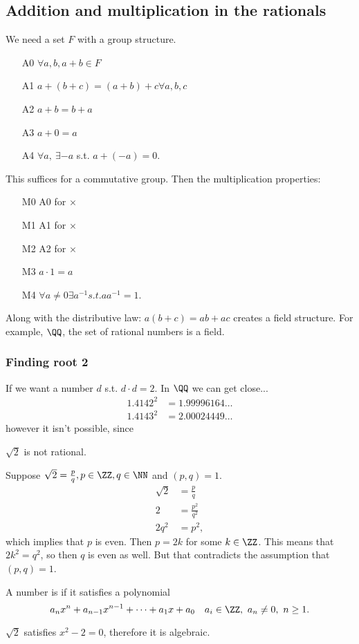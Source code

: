 \documentclass[11pt]{scrartcl}
\numberwithin{equation}{section}
\begin{document}
\subsection{Addition and multiplication in the rationals}
We need a set $F$ with a group structure.
\begin{enumerate}
    \item[A0] $\forall a,b, a+b\in F$
    \item[A1] $a+(b+c) = (a+b)+c\forall a,b,c$
    \item[A2] $a+b=b+a$
    \item[A3] $a+0=a$
    \item[A4] $\forall a, \ \exists-a$ s.t. $a + (-a) = 0$.
\end{enumerate}
This suffices for a commutative group. Then the multiplication properties:
\begin{enumerate}[1.]
    \item[M0] A0 for $\times$
    \item[M1] A1 for $\times$
    \item[M2] A2 for $\times$
    \item[M3] $a\cdot1 = a$
    \item[M4] $\forall a\neq0\exists a^{-1} s.t. aa^{-1}=1$.
\end{enumerate}
Along with the distributive law: $a(b+c) = ab +ac$ creates a field structure. 
For example, $\QQ$, the set of rational numbers is a field.
\subsubsection{Finding root 2}
If we want a number $d$ s.t. $d\cdot d = 2$. In $\QQ$ we can get close... 
\begin{align*}
    1.4142^2 &= 1.99996164\dots \\
    1.4143^2 &= 2.00024449\dots
\end{align*}
however it isn't possible, since
\begin{claim}
    $\sqrt2$ is not rational.
\end{claim}
\begin{subproof}
    Suppose $\sqrt2 = \frac{p}{q}, p \in \ZZ, q \in \NN$ and $(p,q) = 1$.
    \begin{align*}
        \sqrt{2} &= \frac{p}{q} \\
        2 &= \frac{p^2}{q^2} \\
        2q^2 &= p^2,
    \end{align*}
    which implies that $p$ is even. Then $p = 2k$ for some $k \in \ZZ$.
    This means that $2k^2 = q^2$, so then $q$ is even as well. But that contradicts the assumption that $(p,q)=1$.
\end{subproof}
\begin{definition}
    A number is  if it satisfies a polynomial
    \[ a_nx^n + a_{n-1}x^{n-1}+\cdots+a_1x+a_0 \quad a_i \in \ZZ, \ a_n \neq 0, \ n \geq 1.\]
\end{definition}
$\sqrt2$ satisfies $x^2- 2=0$, therefore it is algebraic.
\clearpage
\end{document}
